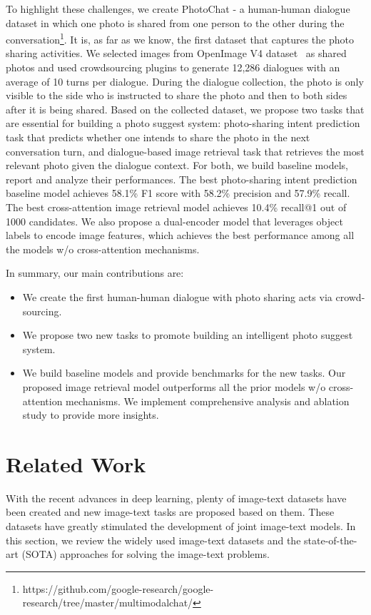 \documentclass[11pt,a4paper]{article}
\begin{document}
To highlight these challenges, we create PhotoChat - a human-human dialogue dataset in which one photo is shared from one person to the other during the conversation\footnote{ https://github.com/google-research/google-research/tree/master/multimodalchat/}. It is, as far as we know, the first dataset that captures the photo sharing activities. We selected images from OpenImage V4 dataset~\cite{OpenImages} as shared photos and used crowdsourcing plugins to generate 12,286 dialogues with an average of 10 turns per dialogue. During the dialogue collection, the photo is only visible to the side who is instructed to share the photo and then to both sides after it is being shared. Based on the collected dataset, we propose two tasks that are essential for building a photo suggest system: photo-sharing intent prediction task that predicts whether one intends to share the photo in the next conversation turn, and dialogue-based image retrieval task that retrieves the most relevant photo given the dialogue context. For both, we build baseline models, report and analyze their performances. The best photo-sharing intent prediction baseline model achieves 58.1\% F1 score with 58.2\% precision and 57.9\% recall. The best cross-attention image retrieval model achieves 10.4\% recall@1 out of 1000 candidates. We also propose a dual-encoder model that leverages object labels to encode image features, which achieves the best performance among all the models w/o cross-attention mechanisms.

In summary, our main contributions are:
\begin{itemize}[align=left,labelsep=0em,noitemsep,topsep=0.2pt]
    \item We create the first human-human dialogue with photo sharing acts via crowd-sourcing. 
    \item We propose two new tasks to promote building an intelligent photo suggest system.
    
\item We build baseline models and provide benchmarks for the new tasks. Our proposed image retrieval model outperforms all the prior models w/o cross-attention mechanisms. We implement comprehensive analysis and ablation study to provide more insights.
\end{itemize}

\section{Related Work}
With the recent advances in deep learning, plenty of image-text datasets have been created and new image-text tasks are proposed based on them. These datasets have greatly stimulated the development of joint image-text models. In this section, we review the widely used image-text datasets and the state-of-the-art (SOTA) approaches for solving the image-text problems.
\end{document}
